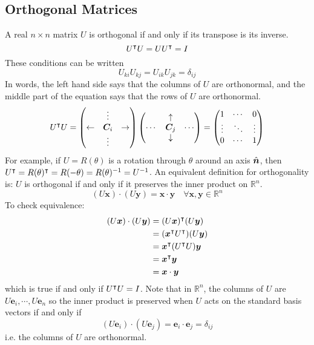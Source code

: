 \documentclass{article}
\begin{document}
\subsection{Orthogonal Matrices}
A real $n \times n$ matrix $U$ is orthogonal if and only if its transpose is its inverse.
\[ U^\intercal U = UU^\intercal = I \]
These conditions can be written
\[ U_{ki}U_{kj} = U_{ik}U_{jk} = \delta_{ij} \]
In words, the left hand side says that the columns of $U$ are orthonormal, and the middle part of the equation says that the rows of $U$ are orthonormal.
\[
	U^\intercal U = \begin{pmatrix}
		           & \vdots  &             \\
		\leftarrow & \bm C_i & \rightarrow \\
		           & \vdots  &
	\end{pmatrix}
	\begin{pmatrix}
		       & \uparrow   &        \\
		\cdots & \bm C_j    & \cdots \\
		       & \downarrow &
	\end{pmatrix}
	= \begin{pmatrix}
		1      & \cdots & 0      \\
		\vdots & \ddots & \vdots \\
		0      & \cdots & 1
	\end{pmatrix}
\]
For example, if $U = R(\theta)$ is a rotation through $\theta$ around an axis $\hat{\bm n}$, then $U^\intercal = R(\theta)^\intercal = R(-\theta) = R(\theta)^{-1} = U^{-1}$. An equivalent definition for orthogonality is: $U$ is orthogonal if and only if it preserves the inner product on $\mathbb R^n$.
\[ (U\bm x)\cdot(U \bm y) = \bm x \cdot \bm y\quad \forall \bm x, \bm y \in \mathbb R^n \]
To check equivalence:
\begin{align*}
	(U\bm x)\cdot(U \bm y) & = (U\bm x)^\intercal (U\bm y)             \\
	                       & = (\bm x^\intercal U^\intercal) (U\bm y) \\
	                       & = \bm x^\intercal (U^\intercal U) \bm y  \\
	                       & = \bm x^\intercal \bm y                   \\
	                       & = \bm x \cdot \bm y
\end{align*}
which is true if and only if $U^\intercal U = I$. Note that in $\mathbb R^n$, the columns of $U$ are $U\bm e_i, \cdots, U\bm e_n$ so the inner product is preserved when $U$ acts on the standard basis vectors if and only if
\[ (U\bm e_i)\cdot(U\bm e_j) = \bm e_i \cdot \bm e_j = \delta_{ij} \]
i.e. the columns of $U$ are orthonormal.
\end{document}
